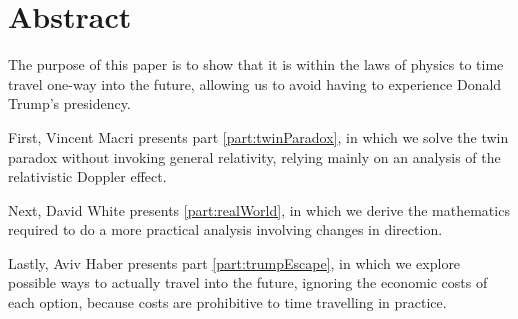 \chapter*{Abstract}
	The purpose of this paper is to show that it is within the laws of physics to time travel one-way into the future, allowing us to avoid having to experience Donald Trump's presidency.

	First, Vincent Macri presents part \ref{part:twinParadox}, in which we solve the twin paradox without invoking general relativity, relying mainly on an analysis of the relativistic Doppler effect.

	Next, David White presents \ref{part:realWorld}, in which we derive the mathematics required to do a more practical analysis involving changes in direction.

	Lastly, Aviv Haber presents part \ref{part:trumpEscape}, in which we explore possible ways to actually travel into the future, ignoring the economic costs of each option, because costs are prohibitive to time travelling in practice.
